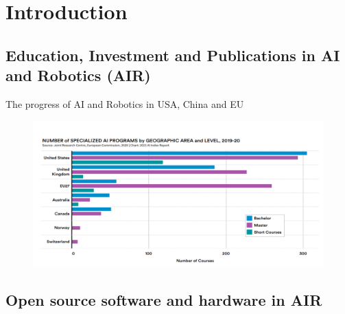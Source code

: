 \section{Introduction}

\subsection{Education, Investment and Publications in AI and Robotics (AIR)}

{

\begin{frame}{The progress of AI and Robotics in USA, China and EU}

\begin{figure}
 \centering
 \includegraphics[width=1.0\textwidth]{./figures/progress-of-air/versions/drawing-v00.png}
\end{figure}

\end{frame}
}



\subsection{Open source software and hardware in AIR}


